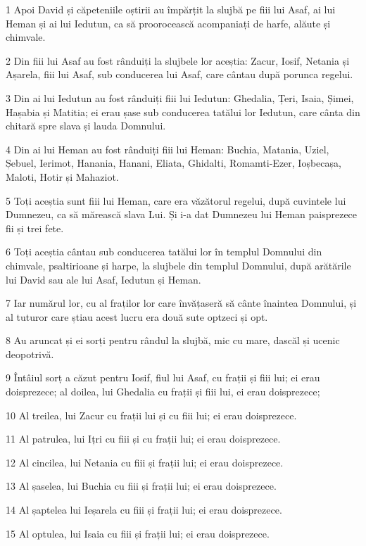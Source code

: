 \par 1 Apoi David și căpeteniile oștirii au împărțit la slujbă pe fiii lui Asaf, ai lui Heman și ai lui Iedutun, ca să proorocească acompaniați de harfe, alăute și chimvale.
\par 2 Din fiii lui Asaf au fost rânduiți la slujbele lor aceștia: Zacur, Iosif, Netania și Așarela, fiii lui Asaf, sub conducerea lui Asaf, care cântau după porunca regelui.
\par 3 Din ai lui Iedutun au fost rânduiți fiii lui Iedutun: Ghedalia, Țeri, Isaia, Șimei, Hașabia și Matitia; ei erau șase sub conducerea tatălui lor Iedutun, care cânta din chitară spre slava și lauda Domnului.
\par 4 Din ai lui Heman au fost rânduiți fiii lui Heman: Buchia, Matania, Uziel, Șebuel, Ierimot, Hanania, Hanani, Eliata, Ghidalti, Romamti-Ezer, Ioșbecașa, Maloti, Hotir și Mahaziot.
\par 5 Toți aceștia sunt fiii lui Heman, care era văzătorul regelui, după cuvintele lui Dumnezeu, ca să mărească slava Lui. Și i-a dat Dumnezeu lui Heman paisprezece fii și trei fete.
\par 6 Toți aceștia cântau sub conducerea tatălui lor în templul Domnului din chimvale, psaltirioane și harpe, la slujbele din templul Domnului, după arătările lui David sau ale lui Asaf, Iedutun și Heman.
\par 7 Iar numărul lor, cu al fraților lor care învățaseră să cânte înaintea Domnului, și al tuturor care știau acest lucru era două sute optzeci și opt.
\par 8 Au aruncat și ei sorți pentru rândul la slujbă, mic cu mare, dascăl și ucenic deopotrivă.
\par 9 Întâiul sorț a căzut pentru Iosif, fiul lui Asaf, cu frații și fiii lui; ei erau doisprezece; al doilea, lui Ghedalia cu frații și fiii lui, ei erau doisprezece;
\par 10 Al treilea, lui Zacur cu frații lui și cu fiii lui; ei erau doisprezece.
\par 11 Al patrulea, lui Ițri cu fiii și cu frații lui; ei erau doisprezece.
\par 12 Al cincilea, lui Netania cu fiii și frații lui; ei erau doisprezece.
\par 13 Al șaselea, lui Buchia cu fiii și frații lui; ei erau doisprezece.
\par 14 Al șaptelea lui Ieșarela cu fiii și frații lui; ei erau doisprezece.
\par 15 Al optulea, lui Isaia cu fiii și frații lui; ei erau doisprezece.
